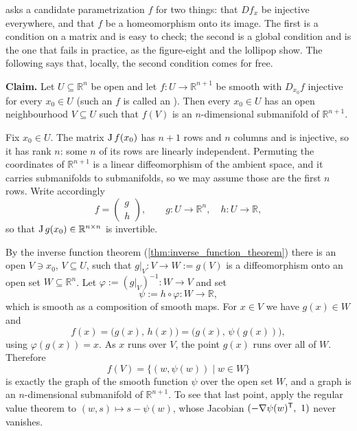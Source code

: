 \begin{example}
\label{ex:immersion_locally_submanifold}
 asks a candidate parametrization $f$ for two things: that $Df_x$
be injective everywhere, and that $f$ be a homeomorphism onto its image. The first is a condition
on a matrix and is easy to check; the second is a global condition and is the one that fails in
practice, as the figure-eight and the lollipop show. The following says that, locally, the second
condition comes for free.

\textbf{Claim.} Let $U \subseteq \mathbb{R}^n$ be open and let $f : U \to \mathbb{R}^{n+1}$ be
smooth with $D_{x_0}f$ injective for every $x_0 \in U$ (such an $f$ is called an
 ). Then every $x_0 \in U$ has an open neighbourhood
$V \subseteq U$ such that $f(V)$ is an $n$-dimensional submanifold of $\mathbb{R}^{n+1}$.

Fix $x_0 \in U$. The matrix $\operatorname{J} f(x_0)$ has $n+1$ rows and $n$ columns and is injective, so it
has rank $n$: some $n$ of its rows are linearly independent. Permuting the coordinates of
$\mathbb{R}^{n+1}$ is a linear diffeomorphism of the ambient space, and it carries submanifolds to
submanifolds, so we may assume those are the first $n$ rows. Write accordingly
\[f = \begin{pmatrix} g \\ h \end{pmatrix}, \qquad g : U \to \mathbb{R}^n,\quad
h : U \to \mathbb{R},\]
so that $\operatorname{J} g(x_0) \in \mathbb{R}^{n\times n}$ is invertible.

By the inverse function theorem (\cref{thm:inverse_function_theorem}) there is an open
$V \ni x_0$, $V \subseteq U$, such that $g|_V : V \to W := g(V)$ is a diffeomorphism onto an open
set $W \subseteq \mathbb{R}^n$. Let $\varphi := (g|_V)^{-1} : W \to V$ and set
\[\psi := h \circ \varphi : W \to \mathbb{R},\]
which is smooth as a composition of smooth maps. For $x \in V$ we have $g(x) \in W$ and
\[f(x) = \big(g(x),\, h(x)\big) = \big(g(x),\, \psi(g(x))\big),\]
using $\varphi(g(x)) = x$. As $x$ runs over $V$, the point $g(x)$ runs over all of $W$. Therefore
\[f(V) = \{(w,\psi(w)) \mid w \in W\}\]
is exactly the graph of the smooth function $\psi$ over the open set $W$, and a graph is an
$n$-dimensional submanifold of $\mathbb{R}^{n+1}$. To see that last point, apply the regular value
theorem to $(w,s) \mapsto s - \psi(w)$, whose Jacobian $(-\nabla\psi(w)\transp,\ 1)$ never
vanishes.


\end{example}
